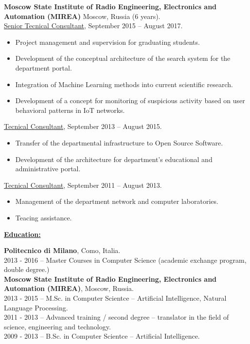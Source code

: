 \documentclass[a4paper,10pt,fullpage]{article}
\begin{document}
\textbf{Moscow State Institute of Radio Engineering, Electronics and Automation (MIREA)} Moscow, Russia (6 years).\\
\underline{Senior Tecnical Consultant}, September 2015 -- August 2017.
\begin{itemize}
	\item[--] Project management and supervision for graduating students.
	\item[--] Development of the conceptual architecture of the search system for the department portal.
	\item[--] Integration of Machine Learning methods into current scientific research.
	\item[--] Development of a concept for monitoring of suspicious activity based on user behavioral patterns in IoT networks.
\end{itemize}
\underline{Tecnical Consultant}, September 2013 -- August 2015.
\begin{itemize}
	\item[--] Transfer of the departmental infrastructure to Open Source Software.
	\item[--] Development of the architecture for department's educational and administrative portal.
\end{itemize}
\underline{Tecnical Consultant}, September 2011 -- August 2013.
\begin{itemize}
	\item[--] Management of the department network and computer laboratories.
	\item[--] Teacing assistance.
\end{itemize}


\begin{center}
	\underline{\textbf{\large Education:}}
\end{center}	
\textbf{Politecnico di Milano}, Como, Italia.\\
2013 - 2016 -- Master Courses in Computer Science (academic exchange program, double degree.)\\

\textbf{Moscow State Institute of Radio Engineering, Electronics and Automation (MIREA)}, Moscow,
Russia.\\
2013 - 2015 -- M.Sc. in Computer Scientce -- Artificial Intelligence, Natural Language Processing.\\
2011 - 2013 -- Advanced training / second degree -- translator in the field of science, engineering and technology.\\
2009 - 2013 -- B.Sc. in Computer Scientce -- Artificial Intelligence.
\end{document}
